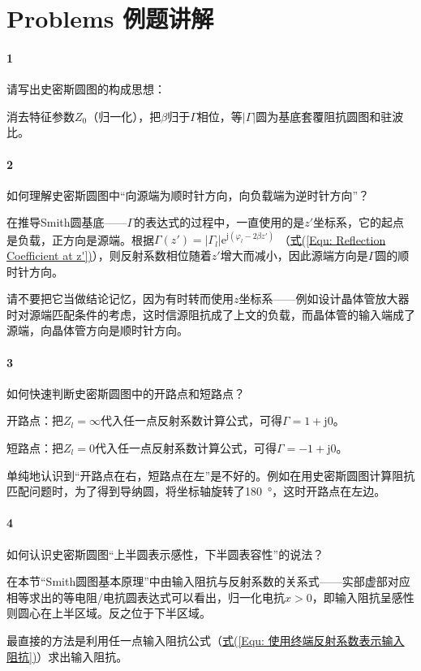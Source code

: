 \section{Problems 例题讲解}
\paragraph{1} 请写出史密斯圆图的构成思想：

消去特征参数$Z_0$（归一化），把$\beta$归于$\varGamma$相位，等$|\varGamma|$圆为基底套覆阻抗圆图和驻波比。

\paragraph{2} 如何理解史密斯圆图中“向源端为顺时针方向，向负载端为逆时针方向”？

在推导Smith圆基底——$\varGamma$的表达式的过程中，一直使用的是$z'$坐标系，它的起点是负载，正方向是源端。根据$\varGamma(z')=|\varGamma_l|\mathrm{e}^{\mathrm{j}(\varphi_l-2\beta z')}$ （\hyperref[Equ: Reflection Coefficient at z']{式(\ref*{Equ: Reflection Coefficient at z'})}），则反射系数相位随着$z'$增大而减小，因此源端方向是$\varGamma$圆的顺时针方向。

请不要把它当做结论记忆，因为有时转而使用$z$坐标系——例如设计晶体管放大器时对源端匹配条件的考虑，这时信源阻抗成了上文的负载，而晶体管的输入端成了源端，向晶体管方向是顺时针方向。

\paragraph{3} 如何快速判断史密斯圆图中的开路点和短路点？

开路点：把$Z_l=\infty$代入任一点反射系数计算公式，可得$\varGamma=1+\mathrm{j}0$。

短路点：把$Z_l=0$代入任一点反射系数计算公式，可得$\varGamma=-1+\mathrm{j}0$。

单纯地认识到“开路点在右，短路点在左”是不好的。例如在用史密斯圆图计算阻抗匹配问题时，为了得到导纳圆，将坐标轴旋转了\SI{180}{\degree}，这时开路点在左边。
\paragraph{4} 如何认识史密斯圆图“上半圆表示感性，下半圆表容性”的说法？

在本节“Smith圆图基本原理”中由输入阻抗与反射系数的关系式——实部虚部对应相等求出的等电阻/电抗圆表达式可以看出，归一化电抗$x>0$，即输入阻抗呈感性则圆心在上半区域。反之位于下半区域。



最直接的方法是利用任一点输入阻抗公式（\hyperref[Equ: 使用终端反射系数表示输入阻抗]{式(\ref*{Equ: 使用终端反射系数表示输入阻抗})}）求出输入阻抗。

